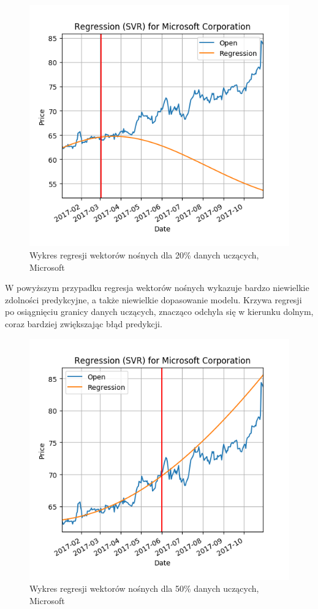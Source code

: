 \begin{figure}[h!]
\centering
\includegraphics[width=150mm]{pictures/plots/microsoft_svr_20.png}
\caption{Wykres regresji wektorów nośnych dla 20\% danych uczących, Microsoft}
\label{fig:microsoft_svr_20}
\end{figure}

W powyższym przypadku regresja wektorów nośnych wykazuje bardzo niewielkie zdolności predykcyjne, a także niewielkie dopasowanie modelu.
Krzywa regresji po osiągnięciu granicy danych uczących, znacząco odchyla się w kierunku dolnym, coraz bardziej zwiększając błąd predykcji.\\

\begin{figure}[h!]
\centering
\includegraphics[width=150mm]{pictures/plots/microsoft_svr_50.png}
\caption{Wykres regresji wektorów nośnych dla 50\% danych uczących, Microsoft}
\label{fig:microsoft_svr_50}
\end{figure}

